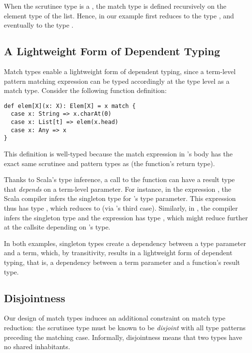 When the scrutinee type is a , the match type  is defined recursively on the element type of the list.
Hence, in our example  first reduces to the type , and eventually to the type .

\subsection{A Lightweight Form of Dependent Typing}
Match types enable a lightweight form of dependent typing, since a term-level pattern matching expression can be typed accordingly at the type level as a match type.
Consider the following function definition:
%
\begin{lstlisting}
def elem[X](x: X): Elem[X] = x match {
  case x: String => x.charAt(0)
  case x: List[t] => elem(x.head)
  case x: Any => x
}
\end{lstlisting}
%
This definition is well-typed because the match expression in 's body has the exact same scrutinee and pattern types as  (the function's return type).

Thanks to Scala's type inference, a call to the  function can have a result type that \emph{depends} on a term-level parameter.
For instance, in the expression , the Scala compiler infers the singleton type  for 's type parameter.
This expression thus has type , which reduces to  (via 's third case).
Similarly, in , the compiler infers the singleton type  and the expression has type , which might reduce further at the callsite depending on 's type.

In both examples, singleton types create a dependency between a type parameter and a term, which, by transitivity, results in a lightweight form of dependent typing, that is, a dependency between a term parameter and a function's result type.

\subsection{Disjointness}
Our design of match types induces an additional constraint on match type reduction: the scrutinee type must be known to be \emph{disjoint} with all type patterns preceding the matching case. Informally, disjointness means that two types have no shared inhabitants.

